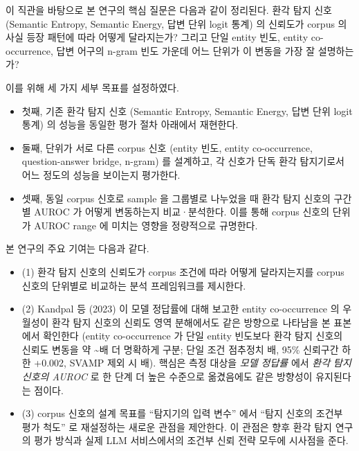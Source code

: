 \documentclass[oneside,ko,under]{snuthesis}
\begin{document}
이 직관을 바탕으로 본 연구의 핵심 질문은 다음과 같이 정리된다. 환각 탐지 신호 (Semantic Entropy, Semantic Energy, 답변 단위 logit 통계) 의 신뢰도가 corpus 의 사실 등장 패턴에 따라 어떻게 달라지는가? 그리고 단일 entity 빈도, entity co-occurrence, 답변 어구의 n-gram 빈도 가운데 어느 단위가 이 변동을 가장 잘 설명하는가?

이를 위해 세 가지 세부 목표를 설정하였다.
\begin{itemize}\setlength{\itemsep}{2pt}
    \item 첫째, 기존 환각 탐지 신호 (Semantic Entropy, Semantic Energy, 답변 단위 logit 통계) 의 성능을 동일한 평가 절차 아래에서 재현한다.
    \item 둘째, 단위가 서로 다른 corpus 신호 (entity 빈도, entity co-occurrence, question-answer bridge, n-gram) 를 설계하고, 각 신호가 단독 환각 탐지기로서 어느 정도의 성능을 보이는지 평가한다.
    \item 셋째, 동일 corpus 신호로 sample 을 그룹별로 나누었을 때 환각 탐지 신호의 구간별 AUROC 가 어떻게 변동하는지 비교·분석한다. 이를 통해 corpus 신호의 단위가 AUROC range 에 미치는 영향을 정량적으로 규명한다.
\end{itemize}

본 연구의 주요 기여는 다음과 같다.
\begin{itemize}\setlength{\itemsep}{2pt}
    \item (1) 환각 탐지 신호의 신뢰도가 corpus 조건에 따라 어떻게 달라지는지를 corpus 신호의 단위별로 비교하는 분석 프레임워크를 제시한다.
    \item (2) Kandpal 등 (2023)\cite{kandpal2023longtail} 이 모델 정답률에 대해 보고한 entity co-occurrence 의 우월성이 환각 탐지 신호의 신뢰도 영역 분해에서도 같은 방향으로 나타남을 본 표본에서 확인한다 (entity co-occurrence 가 단일 entity 빈도보다 환각 탐지 신호의 신뢰도 변동을 약 \HeadlineRatioRangeLow{}\textasciitilde\HeadlineRatioRangeHigh{}배 더 명확하게 구분; 단일 조건 점추정치 \HeadlineEntityPairOverEntityFreqRatio{}배, 95\% 신뢰구간 하한 +0.002, SVAMP 제외 시 \HeadlineSVAMPExclSERatio{}배). 핵심은 측정 대상을 \emph{모델 정답률} 에서 \emph{환각 탐지 신호의 AUROC} 로 한 단계 더 높은 수준으로 옮겼음에도 같은 방향성이 유지된다는 점이다.
    \item (3) corpus 신호의 설계 목표를 ``탐지기의 입력 변수'' 에서 ``탐지 신호의 조건부 평가 척도'' 로 재설정하는 새로운 관점을 제안한다. 이 관점은 향후 환각 탐지 연구의 평가 방식과 실제 LLM 서비스에서의 조건부 신뢰 전략 모두에 시사점을 준다.
\end{itemize}
\end{document}
